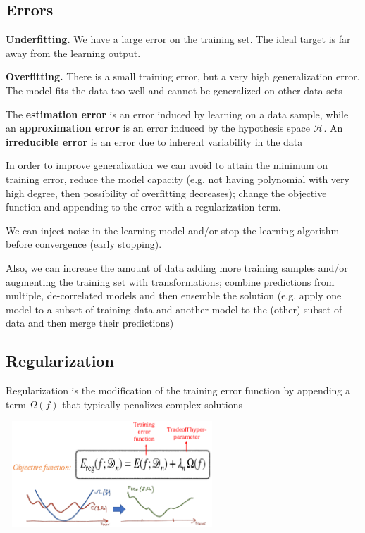 \documentclass{article}
\begin{document}
\subsection*{Errors}
\textbf{Underfitting. } We have a large error on the training set. The ideal target is far away from the learning output.

\textbf{Overfitting.} There is a small training error, but a very high generalization error. The model fits the data too well and cannot be generalized on other data sets

The \textbf{estimation error} is an error induced by learning on a data sample, while an \textbf{approximation error} is an error induced by the hypothesis space \(\mathcal{H}\). An \textbf{irreducible error} is an error due to inherent variability in the data


In order to improve generalization we can avoid to attain the minimum on training error, reduce the model capacity (e.g. not having polynomial with very high degree, then possibility of overfitting decreases); change the objective function and appending to the error with a regularization term. 

We can inject noise in the learning model and/or stop the learning algorithm before convergence (early stopping).

Also, we can increase the amount of data adding more training samples and/or augmenting the training set with transformations; combine predictions from multiple, de-correlated models and then ensemble the solution (e.g. apply one model to a subset of training data and another model to the (other) subset of data and then merge their predictions)

\subsection*{Regularization}

\begin{minipage}{0.35\linewidth}
Regularization is the modification of the training error function by appending a term \(\Omega(f)\) that typically penalizes complex solutions
\end{minipage}
\hfil
\begin{minipage}{0.55\linewidth}
	\includegraphics[width=8cm, height=4cm]{img/regularization.png}
\end{minipage}
\end{document}
